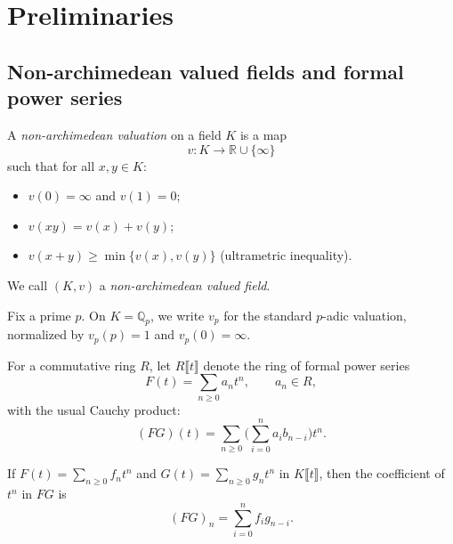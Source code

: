 \section{Preliminaries}

\subsection{Non-archimedean valued fields and formal power series}

\begin{definition}
  \label{def:nonarch_valuation}
  \leanok
  \uses{}
  A \emph{non-archimedean valuation} on a field $K$ is a map
  \[
    v : K \to \mathbb{R}\cup\{\infty\}
  \]
  such that for all $x,y\in K$:
  \begin{itemize}
    \item $v(0)=\infty$ and $v(1)=0$;
    \item $v(xy)=v(x)+v(y)$;
    \item $v(x+y)\ge \min\{v(x),v(y)\}$ (ultrametric inequality).
  \end{itemize}
  We call $(K,v)$ a \emph{non-archimedean valued field}.
\end{definition}

\begin{definition}
  \label{def:vp_Qp}
  \leanok
  Fix a prime $p$. On $K=\mathbb{Q}_p$, we write $v_p$ for the standard $p$-adic valuation,
  normalized by $v_p(p)=1$ and $v_p(0)=\infty$.
\end{definition}

\begin{definition}
  \label{def:fps_ring}
  \leanok
  \uses{}
  For a commutative ring $R$, let $R\llbracket t\rrbracket$ denote the ring of formal power series
  \[
    F(t)=\sum_{n\ge 0} a_n t^n,\qquad a_n\in R,
  \]
  with the usual Cauchy product:
  \[
    (FG)(t)=\sum_{n\ge 0}\Big(\sum_{i=0}^n a_i b_{n-i}\Big)t^n.
  \]
\end{definition}

\begin{lemma}
  \label{lem:coeff_mul}
  \leanok
  If $F(t)=\sum_{n\ge 0} f_n t^n$ and $G(t)=\sum_{n\ge 0} g_n t^n$ in $K\llbracket t\rrbracket$, then
  the coefficient of $t^n$ in $FG$ is
  \[
    (FG)_n = \sum_{i=0}^n f_i g_{n-i}.
  \]
\end{lemma}

